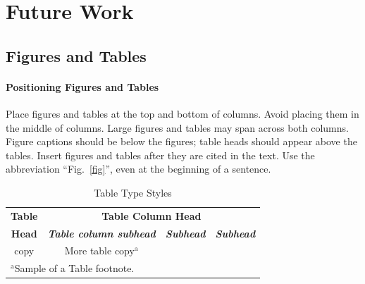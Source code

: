 \documentclass[conference]{IEEEtran}
\begin{document}
\section{Future Work}


\subsection{Figures and Tables}
\paragraph{Positioning Figures and Tables} Place figures and tables at the top and 
bottom of columns. Avoid placing them in the middle of columns. Large 
figures and tables may span across both columns. Figure captions should be 
below the figures; table heads should appear above the tables. Insert 
figures and tables after they are cited in the text. Use the abbreviation 
``Fig.~\ref{fig}'', even at the beginning of a sentence.

\begin{table}[htbp]
\caption{Table Type Styles}
\begin{center}
\begin{tabular}{|c|c|c|c|}
\hline
\textbf{Table}&\multicolumn{3}{|c|}{\textbf{Table Column Head}} \\
\cline{2-4} 
\textbf{Head} & \textbf{\textit{Table column subhead}}& \textbf{\textit{Subhead}}& \textbf{\textit{Subhead}} \\
\hline
copy& More table copy$^{\mathrm{a}}$& &  \\
\hline
\multicolumn{4}{l}{$^{\mathrm{a}}$Sample of a Table footnote.}
\end{tabular}
\label{tab1}
\end{center}
\end{table}
\end{document}
